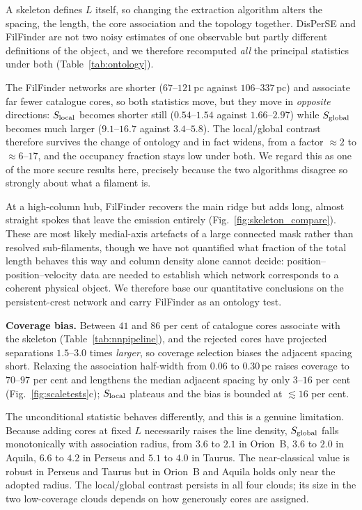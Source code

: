 \documentclass[usenatbib,twoside,twocolumn]{mnras}
\begin{document}
A skeleton defines $L$ itself, so changing the extraction algorithm alters the spacing, the length, the core association and the topology together. DisPerSE and FilFinder are not two noisy estimates of one observable but partly different definitions of the object, and we therefore recomputed \emph{all} the principal statistics under both (Table~\ref{tab:ontology}).

The FilFinder networks are shorter ($67$--$121$\,pc against $106$--$337$\,pc) and associate far fewer catalogue cores, so both statistics move, but they move in \emph{opposite} directions: $S_{\rm local}$ becomes shorter still ($0.54$--$1.54$ against $1.66$--$2.97$) while $S_{\rm global}$ becomes much larger ($9.1$--$16.7$ against $3.4$--$5.8$). The local/global contrast therefore survives the change of ontology and in fact widens, from a factor $\approx2$ to $\approx6$--$17$, and the occupancy fraction stays low under both. We regard this as one of the more secure results here, precisely because the two algorithms disagree so strongly about what a filament is.

At a high-column hub, FilFinder recovers the main ridge but adds long, almost straight spokes that leave the emission entirely (Fig.~\ref{fig:skeleton_compare}). These are most likely medial-axis artefacts of a large connected mask rather than resolved sub-filaments, though we have not quantified what fraction of the total length behaves this way and column density alone cannot decide: position--position--velocity data are needed to establish which network corresponds to a coherent physical object. We therefore base our quantitative conclusions on the persistent-crest network and carry FilFinder as an ontology test.

\smallskip\noindent\textbf{Coverage bias.} Between $41$ and $86$ per cent of catalogue cores associate with the skeleton (Table~\ref{tab:nnpipeline}), and the rejected cores have projected separations $1.5$--$3.0$ times \emph{larger}, so coverage selection biases the adjacent spacing short. Relaxing the association half-width from $0.06$ to $0.30$\,pc raises coverage to $70$--$97$ per cent and lengthens the median adjacent spacing by only $3$--$16$ per cent (Fig.~\ref{fig:scaletests}c); $S_{\rm local}$ plateaus and the bias is bounded at $\lesssim16$ per cent.

The unconditional statistic behaves differently, and this is a genuine limitation. Because adding cores at fixed $L$ necessarily raises the line density, $S_{\rm global}$ falls monotonically with association radius, from $3.6$ to $2.1$ in Orion~B, $3.6$ to $2.0$ in Aquila, $6.6$ to $4.2$ in Perseus and $5.1$ to $4.0$ in Taurus. The near-classical value is robust in Perseus and Taurus but in Orion~B and Aquila holds only near the adopted radius. The local/global contrast persists in all four clouds; its size in the two low-coverage clouds depends on how generously cores are assigned.
\end{document}

